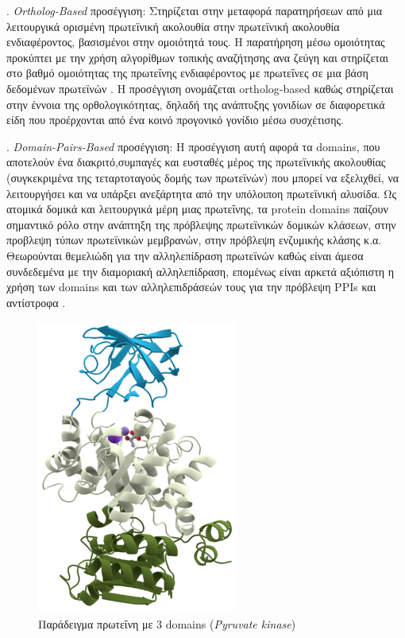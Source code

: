 . \textit{Ortholog-Based} προσέγγιση: Στηρίζεται στην μεταφορά παρατηρήσεων από μια λειτουργικά ορισμένη πρωτεϊνική ακολουθία στην πρωτεϊνική ακολουθία ενδιαφέροντος, βασισμένοι στην ομοιότητά τους. Η παρατήρηση μέσω ομοιότητας προκύπτει με την χρήση αλγορίθμων τοπικής αναζήτησης ανα ζεύγη και στηρίζεται στο βαθμό ομοιότητας της πρωτεΐνης ενδιαφέροντος με πρωτεΐνες σε μια βάση δεδομένων πρωτεϊνών \cite{Lee2008}. Η προσέγγιση ονομάζεται ortholog-based καθώς στηρίζεται στην έννοια της ορθολογικότητας, δηλαδή της ανάπτυξης γονιδίων σε διαφορετικά είδη που προέρχονται από ένα κοινό προγονικό γονίδιο μέσω συσχέτισης.

. \textit{Domain-Pairs-Based} προσέγγιση: Η προσέγγιση αυτή αφορά τα domains, που αποτελούν ένα διακριτό,συμπαγές και ευσταθές μέρος της πρωτεϊνικής ακολουθίας (συγκεκριμένα της τεταρτοταγούς δομής των πρωτεϊνών) που μπορεί να εξελιχθεί, να λειτουργήσει και να υπάρξει ανεξάρτητα από την υπόλοιποη πρωτεϊνική αλυσίδα. Ως ατομικά δομικά και λειτουργικά μέρη μιας πρωτεΐνης, τα protein domains παίζουν σημαντικό ρόλο στην ανάπτηξη της πρόβλεψης πρωτεϊνικών δομικών κλάσεων, στην προβλεψη τύπων πρωτεϊνικών μεμβρανών, στην πρόβλεψη ενζυμικής κλάσης κ.α. Θεωρούνται θεμελιώδη για την αλληλεπίδραση πρωτεϊνών καθώς είναι άμεσα συνδεδεμένα με την διαμοριακή αλληλεπίδραση, επομένως είναι αρκετά αξιόπιστη η χρήση των domains και των αλληλεπιδράσεών τους για την πρόβλεψη PPIs και αντίστροφα \cite{Wojcik2001}.

\begin{figure}[h]
  \centering
  \includegraphics[scale=0.48]{images/Pyruvate_kinase_protein_domains.png}
  \caption{Παράδειγμα πρωτεΐνη με 3 domains (\textit{Pyruvate kinase})}
  \label{fig:Pyruvate_kinase_protein_domains}
\end{figure}

